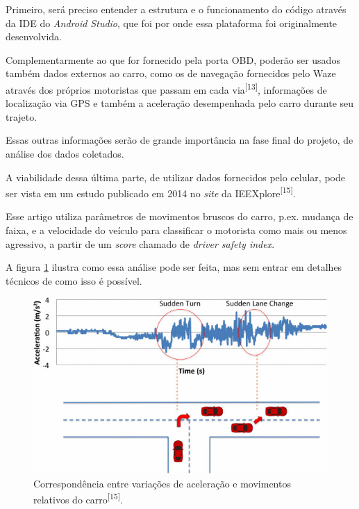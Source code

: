 Primeiro, será preciso entender a estrutura e o funcionamento do código através da IDE do \textit{Android Studio}, que foi por onde essa plataforma foi originalmente desenvolvida.

Complementarmente ao que for fornecido pela porta OBD, poderão ser usados também dados externos ao carro, como os de navegação fornecidos pelo Waze através dos próprios motoristas que passam em cada via\textsuperscript{[13]}, informações de localização via GPS e também a aceleração desempenhada pelo carro durante seu trajeto.

Essas outras informações serão de grande importância na fase final do projeto, de análise dos dados coletados.

A viabilidade dessa última parte, de utilizar dados fornecidos pelo celular, pode ser vista em um estudo publicado em 2014 no \textit{site} da IEEXplore\textsuperscript{[15]}.

Esse artigo utiliza parâmetros de movimentos bruscos do carro, p.ex. mudança de faixa, e a velocidade do veículo para classificar o motorista como mais ou menos agressivo, a partir de um \textit{score} chamado de \textit{driver safety index}.

A figura \ref{fig:sudden_acc_car} ilustra como essa análise pode ser feita, mas sem entrar em detalhes técnicos de como isso é possível.

\begin{figure}[hp]
    \centering
    
    \includegraphics[scale=0.6]{figures/sudden_acc_car.jpg}
    
    \caption{Correspondência entre variações de aceleração e movimentos relativos do carro\textsuperscript{[15]}.}
    
    \label{fig:sudden_acc_car}
\end{figure}

